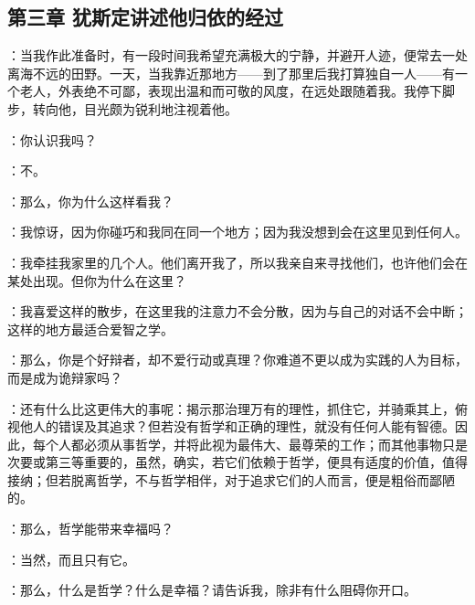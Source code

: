 
\subsection{第三章 犹斯定讲述他归依的经过}

：当我作此准备时，有一段时间我希望充满极大的宁静，并避开人迹，便常去一处离海不远的田野。一天，当我靠近那地方——到了那里后我打算独自一人——有一个老人，外表绝不可鄙，表现出温和而可敬的风度，在远处跟随着我。我停下脚步，转向他，目光颇为锐利地注视着他。\par

：你认识我吗？\par

：不。\par

：那么，你为什么这样看我？\par

：我惊讶，因为你碰巧和我同在同一个地方；因为我没想到会在这里见到任何人。\par

：我牵挂我家里的几个人。他们离开我了，所以我亲自来寻找他们，也许他们会在某处出现。但你为什么在这里？\par

：我喜爱这样的散步，在这里我的注意力不会分散，因为与自己的对话不会中断；这样的地方最适合爱智之学。\par

：那么，你是个好辩者，却不爱行动或真理？你难道不更以成为实践的人为目标，而是成为诡辩家吗？\par

：还有什么比这更伟大的事呢：揭示那治理万有的理性，抓住它，并骑乘其上，俯视他人的错误及其追求？但若没有哲学和正确的理性，就没有任何人能有智德。因此，每个人都必须从事哲学，并将此视为最伟大、最尊荣的工作；而其他事物只是次要或第三等重要的，虽然，确实，若它们依赖于哲学，便具有适度的价值，值得接纳；但若脱离哲学，不与哲学相伴，对于追求它们的人而言，便是粗俗而鄙陋的。\par

：那么，哲学能带来幸福吗？\par

：当然，而且只有它。\par

：那么，什么是哲学？什么是幸福？请告诉我，除非有什么阻碍你开口。\par

